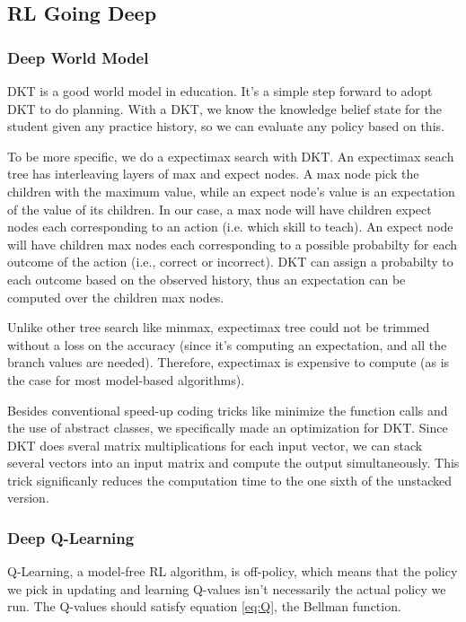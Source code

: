 \subsection{RL Going Deep}

\subsubsection{Deep World Model}

DKT is a good world model in education. It's a simple step forward to adopt DKT to do planning. With a DKT, we know the knowledge belief state for the student given any practice history, so we can evaluate any policy based on this.

To be more specific, we do a expectimax search with DKT. An expectimax seach tree has interleaving layers of max and expect nodes. A max node pick the children with the maximum value, while an expect node's value is an expectation of the value of its children. In our case, a max node will have children expect nodes each corresponding to an action (i.e. which skill to teach). An expect node will have children max nodes each corresponding to a possible probabilty for each outcome of the action (i.e., correct or incorrect). DKT can assign a probabilty to each outcome based on the observed history, thus an expectation can be computed over the children max nodes.

Unlike other tree search like minmax, expectimax tree could not be trimmed without a loss on the accuracy (since it's computing an expectation, and all the branch values are needed). Therefore, expectimax is expensive to compute (as is the case for most model-based algorithms).

Besides conventional speed-up coding tricks like minimize the function calls and the use of abstract classes, we specifically made an optimization for DKT. Since DKT does sveral matrix multiplications for each input vector, we can stack several vectors into an input matrix and compute the output simultaneously. This trick significanly reduces the computation time to the one sixth of the unstacked version.

\subsubsection{Deep Q-Learning}

Q-Learning, a model-free RL algorithm, is off-policy, which means that the policy we pick in updating and learning Q-values isn't necessarily the actual policy we run. The Q-values should satisfy equation \ref{eq:Q}, the Bellman function.

